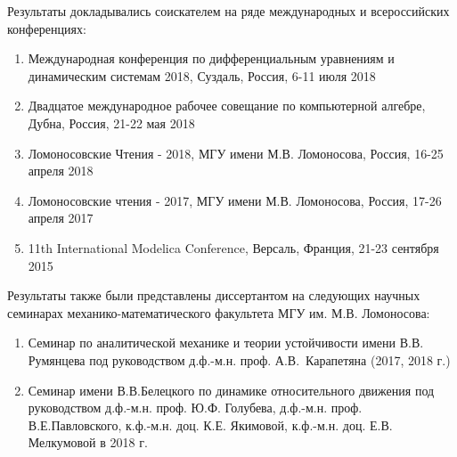 Результаты докладывались соискателем на ряде международных и всероссийских конференциях:
\begin{enumerate}
    \item Международная конференция по дифференциальным уравнениям и динамическим системам 2018, Суздаль, Россия, 6-11 июля 2018
    \item Двадцатое международное рабочее совещание по компьютерной алгебре, Дубна, Россия, 21-22 мая 2018
    \item Ломоносовские Чтения - 2018, МГУ имени М.В. Ломоносова, Россия, 16-25 апреля 2018
    \item Ломоносовские чтения - 2017, МГУ имени М.В. Ломоносова, Россия, 17-26 апреля 2017
    \item 11th International Modelica Conference, Версаль, Франция, 21-23 сентября 2015
\end{enumerate}
Результаты также были представлены диссертантом на следующих научных семинарах механико-математического факультета МГУ им. М.В. Ломоносова:
\begin{enumerate}
    \item Семинар по аналитической механике и теории устойчивости имени В.В. Румянцева под руководством д.ф.-м.н. проф. А.В.~Карапетяна (2017, 2018 г.)
    \item Семинар имени В.В.Белецкого по динамике относительного движения под руководством д.ф.-м.н. проф. Ю.Ф. Голубева, д.ф.-м.н. проф. В.Е.Павловского, к.ф.-м.н. доц. К.Е. Якимовой, к.ф.-м.н. доц. Е.В. Мелкумовой в 2018 г.
\end{enumerate}
